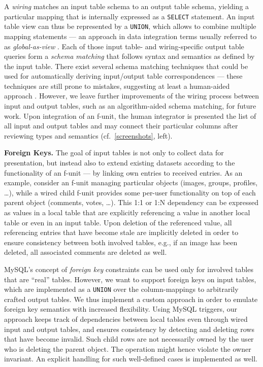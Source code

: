 \documentclass{src/acm_proc_article-sp} \else
\newcommand\myparagraph[1]{\medskip\noindent\textbf{#1.}}
\begin{document}
A \emph{wiring} matches an input table schema to an output table
schema, yielding a particular mapping that is internally expressed as
a \texttt{SELECT} statement. An input table view can thus be
represented by a \texttt{UNION}, which allows to combine multiple
mapping statements --- an approach in data integration terms usually
referred to as \emph{global-as-view}
\cite{Lenzerini2002:DataIntegration}. Each of those input table- and
wiring-specific output table queries form a \emph{schema matching}
that follows syntax and semantics as defined by the input table.
There exist several schema matching techniques that could be used for
automatically deriving input/output table correspondences --- these
techniques are still prone to mistakes, suggesting at least a
human-aided approach \cite{Bernstein2011:SchemaMatching}. However, we
leave further improvements of the wiring process between input and
output tables, such as an algorithm-aided schema matching, for future
work.
Upon integration of an f-unit, the human integrator is presented the
list of all input and output tables and may connect their particular
columns after reviewing types and semantics
(cf.~\autoref{screenshots}, left).

\myparagraph{Foreign Keys}
The goal of input tables is not only to collect data for
presentation, but instead also to extend existing datasets according
to the functionality of an f-unit --- by linking own entries to
received entries. As an example, consider an f-unit managing
particular objects (images, groups, profiles, \ldots), while a wired
child f-unit provides some per-user functionality on top of each
parent object (comments, votes, \ldots).
This 1:1 or 1:N dependency can be expressed as values in a local
table that are explicitly referencing a value in another local table
or even in an input table.
Upon deletion of the referenced value, all referencing entries that
have become stale are implicitly deleted in order to ensure
consistency between both involved tables, e.g., if an image has been
deleted, all associated comments are deleted as well.

MySQL's concept of \emph{foreign key} constraints \cite{mysql-innodb-foreign-key-constraints} can be used only for involved tables that are ``real'' tables. However, we want to support foreign keys on input tables, which are implemented as a \texttt{UNION} over the column-mappings to arbitrarily crafted output tables. We thus implement a custom approach in order to emulate foreign key semantics with increased flexibility. Using MySQL triggers, our approach keeps track of dependencies between local tables even through wired input and output tables, and ensures consistency by detecting and deleting rows that have become invalid. Such child rows are not necessarily owned by the user who is deleting the parent object. The operation might hence violate the owner invariant. An explicit handling for such well-defined cases is  implemented as well.
\end{document}
